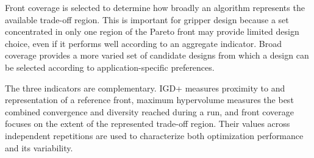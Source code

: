 Front coverage is selected to determine how broadly an algorithm represents the available trade-off region. This is important for gripper design
because a set concentrated in only one region of the Pareto front may provide limited design choice, even if it performs well according to an
aggregate indicator. Broad coverage provides a more varied set of candidate designs from which a design can be selected according to
application-specific preferences.

The three indicators are complementary. IGD+ measures proximity to and representation of a reference front, maximum hypervolume measures the best
combined convergence and diversity reached during a run, and front coverage focuses on the extent of the represented trade-off region. Their values
across independent repetitions are used to characterize both optimization performance and its variability.